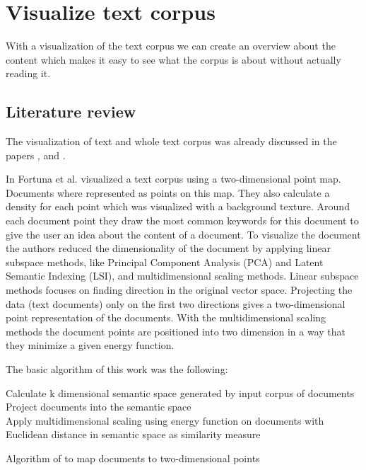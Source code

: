 \section{Visualize text corpus}

With a visualization of the text corpus we can create an overview about the content which makes it easy to see what the corpus is about without actually reading it. 

\subsection{Literature review}

The visualization of text and whole text corpus was already discussed in the papers  \cite{journals/informaticaSI/FortunaGM05},  \cite{doi:10.1117/12.647867} and \cite{visualiuationCorpus3}. 


In  \cite{journals/informaticaSI/FortunaGM05} Fortuna et al. visualized a text corpus using a two-dimensional point map. Documents where represented as points on this map. They also calculate a density for each point which was visualized with a background texture. Around each document point they draw the most common keywords for this document to give the user an idea about the content of a document. To visualize the document the authors reduced the dimensionality of the document by applying linear subspace methods, like Principal Component Analysis (PCA) and Latent Semantic Indexing (LSI), and multidimensional scaling methods. Linear subspace methods focuses on finding direction in the original vector space. Projecting the data (text documents) only on the first two directions gives a two-dimensional point representation of the documents. With the multidimensional scaling methods the document points are positioned into two dimension in a way that they minimize a given energy function. 


The basic algorithm of this work was the following: 
\begin{algorithm}
	
	 Calculate k dimensional semantic space generated by input corpus of documents \\
	 Project documents into the semantic space \\
	 Apply multidimensional scaling using energy function on documents with Euclidean distance in semantic space as similarity measure 
	
	\caption{Algorithm of \cite{journals/informaticaSI/FortunaGM05} to map documents to two-dimensional points}
\end{algorithm}

